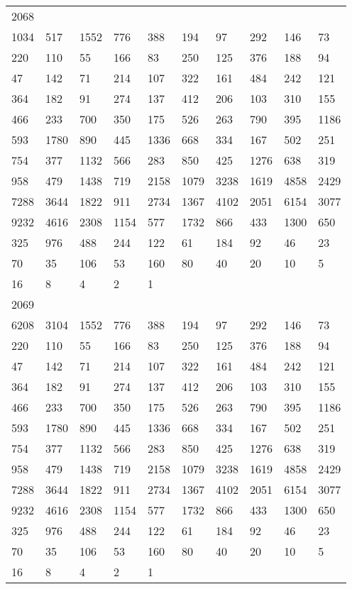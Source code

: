\begin{longtable}{*{10}{l}}
2068&&&&&&&&&\\
1034& 517& 1552& 776& 388& 194& 97& 292& 146& 73\\
220& 110& 55& 166& 83& 250& 125& 376& 188& 94\\
47& 142& 71& 214& 107& 322& 161& 484& 242& 121\\
364& 182& 91& 274& 137& 412& 206& 103& 310& 155\\
466& 233& 700& 350& 175& 526& 263& 790& 395& 1186\\
593& 1780& 890& 445& 1336& 668& 334& 167& 502& 251\\
754& 377& 1132& 566& 283& 850& 425& 1276& 638& 319\\
958& 479& 1438& 719& 2158& 1079& 3238& 1619& 4858& 2429\\
7288& 3644& 1822& 911& 2734& 1367& 4102& 2051& 6154& 3077\\
9232& 4616& 2308& 1154& 577& 1732& 866& 433& 1300& 650\\
325& 976& 488& 244& 122& 61& 184& 92& 46& 23\\
70& 35& 106& 53& 160& 80& 40& 20& 10& 5\\
16& 8& 4& 2& 1& \\

2069&&&&&&&&&\\
6208& 3104& 1552& 776& 388& 194& 97& 292& 146& 73\\
220& 110& 55& 166& 83& 250& 125& 376& 188& 94\\
47& 142& 71& 214& 107& 322& 161& 484& 242& 121\\
364& 182& 91& 274& 137& 412& 206& 103& 310& 155\\
466& 233& 700& 350& 175& 526& 263& 790& 395& 1186\\
593& 1780& 890& 445& 1336& 668& 334& 167& 502& 251\\
754& 377& 1132& 566& 283& 850& 425& 1276& 638& 319\\
958& 479& 1438& 719& 2158& 1079& 3238& 1619& 4858& 2429\\
7288& 3644& 1822& 911& 2734& 1367& 4102& 2051& 6154& 3077\\
9232& 4616& 2308& 1154& 577& 1732& 866& 433& 1300& 650\\
325& 976& 488& 244& 122& 61& 184& 92& 46& 23\\
70& 35& 106& 53& 160& 80& 40& 20& 10& 5\\
16& 8& 4& 2& 1& \\


\end{longtable}
